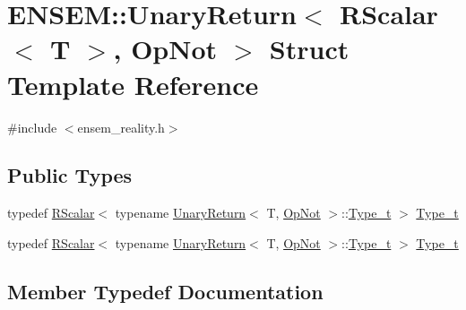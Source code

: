 \hypertarget{structENSEM_1_1UnaryReturn_3_01RScalar_3_01T_01_4_00_01OpNot_01_4}{}\section{E\+N\+S\+EM\+:\+:Unary\+Return$<$ R\+Scalar$<$ T $>$, Op\+Not $>$ Struct Template Reference}
\label{structENSEM_1_1UnaryReturn_3_01RScalar_3_01T_01_4_00_01OpNot_01_4}


{\ttfamily \#include $<$ensem\+\_\+reality.\+h$>$}

\subsection*{Public Types}
\begin{DoxyCompactItemize}
\item 
typedef \mbox{\hyperlink{classENSEM_1_1RScalar}{R\+Scalar}}$<$ typename \mbox{\hyperlink{structENSEM_1_1UnaryReturn}{Unary\+Return}}$<$ T, \mbox{\hyperlink{structENSEM_1_1OpNot}{Op\+Not}} $>$\+::\mbox{\hyperlink{structENSEM_1_1UnaryReturn_3_01RScalar_3_01T_01_4_00_01OpNot_01_4_af9f59bfbcb4e45c668599e7707d39a0c}{Type\+\_\+t}} $>$ \mbox{\hyperlink{structENSEM_1_1UnaryReturn_3_01RScalar_3_01T_01_4_00_01OpNot_01_4_af9f59bfbcb4e45c668599e7707d39a0c}{Type\+\_\+t}}
\item 
typedef \mbox{\hyperlink{classENSEM_1_1RScalar}{R\+Scalar}}$<$ typename \mbox{\hyperlink{structENSEM_1_1UnaryReturn}{Unary\+Return}}$<$ T, \mbox{\hyperlink{structENSEM_1_1OpNot}{Op\+Not}} $>$\+::\mbox{\hyperlink{structENSEM_1_1UnaryReturn_3_01RScalar_3_01T_01_4_00_01OpNot_01_4_af9f59bfbcb4e45c668599e7707d39a0c}{Type\+\_\+t}} $>$ \mbox{\hyperlink{structENSEM_1_1UnaryReturn_3_01RScalar_3_01T_01_4_00_01OpNot_01_4_af9f59bfbcb4e45c668599e7707d39a0c}{Type\+\_\+t}}
\end{DoxyCompactItemize}


\subsection{Member Typedef Documentation}
\mbox{\label{structENSEM_1_1UnaryReturn_3_01RScalar_3_01T_01_4_00_01OpNot_01_4_af9f59bfbcb4e45c668599e7707d39a0c}} 
